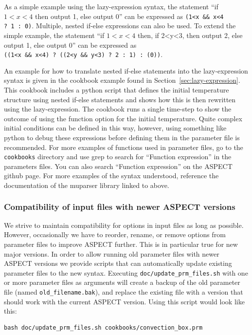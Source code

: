 \documentclass{article}
\newcommand{\aspect}{\textsc{ASPECT}}
\begin{document}
As a simple example using the lazy-expression syntax, the statement ``if $1<x<4$ then output 1, else output 0''
can be expressed as \texttt{(1<x\ \&\&\ x<4 ?\ 1\ :\ 0)}.  Multiple, nested if-else expressions
can also be used. To extend the simple example, the statement  
``if $1<x<4$ then, if 2<y<3, then output 2, else output 1, else output 0''
can be expressed as \texttt{((1<x\ \&\&\ x<4)\ ?\ ((2<y\ \&\&\ y<3)\ ?\ 2\ :\ 1)\ :\ (0))}.

An example for how to translate nested if-else statements into the lazy-expression syntax is given in the
cookbook example found in Section~\ref{sec:lazy-expression}. This cookbook includes a python script that defines
the initial temperature structure using nested if-else statements and shows how this is then rewritten
using the lazy-expression. The cookbook runs a single time-step to show the outcome of using the function
option for the initial temperature. Quite complex initial conditions can be defined in this way, however,
using something like python to debug these expressions before defining them in the parameter file is 
recommended. For more examples of functions used in parameter files, go to the \texttt{cookbooks} 
directory and use grep to search for ``Function expression'' in the parameters files. 
You can also search ``Function expression'' on the \aspect{} github page.
For more examples of the syntax understood, reference the documentation of the muparser library
linked to above.

\subsubsection{Compatibility of input files with newer \aspect{} versions}

We strive to maintain compatibility for options in input files as long as
possible. However, occasionally we have to reorder, rename, or remove options
from parameter files to improve \aspect{} further. This is in particular true
for new major versions. In order to allow running old parameter files with
newer \aspect{} versions we provide scripts that can automatically update
existing parameter files to the new syntax. Executing
\texttt{doc/update\_prm\_files.sh} with one or more parameter files as
arguments will create a backup of the old parameter file (named
\texttt{old\_filename.bak}), and replace the existing file with a version that
should work with the current \aspect{} version. Using this script would look
like this:

\begin{lstlisting}[frame=single,language=ksh,showstringspaces=false]
bash doc/update_prm_files.sh cookbooks/convection_box.prm
\end{lstlisting}
\end{document}
